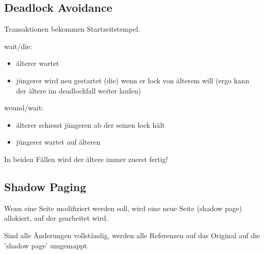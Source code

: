 \documentclass[10pt,a4paper,oneside]{report}
\begin{document}
\subsection*{Deadlock Avoidance}

Transaktionen bekommen Startzeitstempel.

wait/die:

\begin{itemize}
\item älterer wartet
\item jüngerer wird neu gestartet (die) wenn er lock von älterem will (ergo kann der ältere im deadlockfall weiter laufen)
\end{itemize}

wound/wait:

\begin{itemize}
\item älterer schiesst jüngeren ab der seinen lock hält
\item jüngerer wartet auf älteren
\end{itemize}

In beiden Fällen wird der ältere immer zuerst fertig!

\subsection*{Shadow Paging}

Wenn eine Seite modifiziert werden soll, wird eine neue Seite (shadow page) allokiert, auf der gearbeitet wird.

Sind alle Änderungen vollständig, werden alle Referenzen auf das Original auf die 'shadow page' umgemappt.
\end{document}
